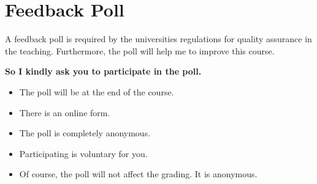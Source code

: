 \section{Feedback Poll}

A feedback poll is required by the universities regulations for quality assurance in the teaching. Furthermore, the poll will help me to improve this course.

\textbf{So I kindly ask you to participate in the poll.}

\begin{itemize}
	\item The poll will be at the end of the course.
	\item There is an online form.
	\item The poll is completely anonymous.
	\item Participating is voluntary for you.
	\item Of course, the poll will not affect the grading. It is anonymous.
\end{itemize}
